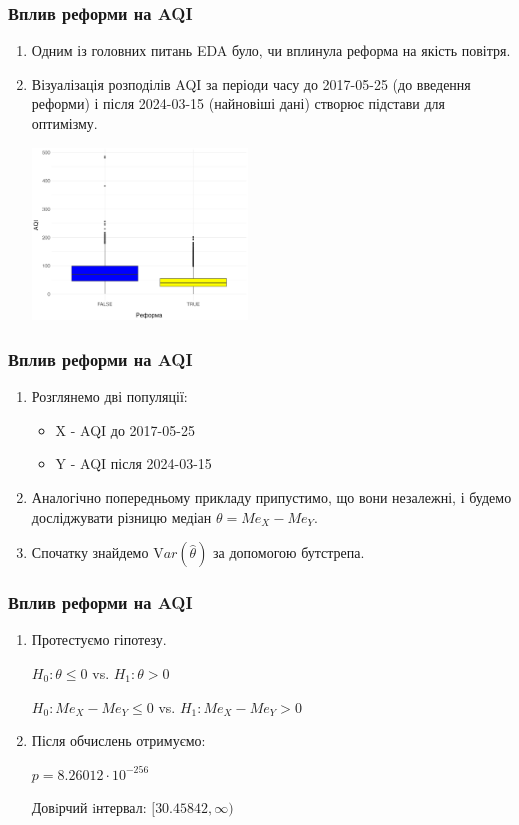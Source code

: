 \documentclass{beamer}
\begin{document}
\begin{frame}
  \frametitle{Вплив реформи на AQI}

  \begin{enumerate}
    \item Одним із головних питань EDA було, чи вплинула реформа на якість повітря. 
    \item Візуалізація розподілів AQI за періоди часу до 2017-05-25 (до введення реформи) і 
    після 2024-03-15 (найновіші дані) створює підстави для оптимізму.
  
    \begin{center}
      \includegraphics[height=1.8in]{./plots/lab2/hypotheses/reform_vs_aqi.png}
    \end{center}
  \end{enumerate}
\end{frame}

\begin{frame}
  \frametitle{Вплив реформи на AQI}

  \begin{enumerate}
    \item Розглянемо дві популяції:

    \begin{itemize}
      \item X - AQI до 2017-05-25
      \item Y - AQI після 2024-03-15
    \end{itemize}

    \item Аналогічно попередньому прикладу припустимо, що вони незалежні, 
    і будемо досліджувати різницю медіан $\theta = Me_X - Me_Y$.  
    
    \item Спочатку знайдемо $\mathrm Var(\hat{\theta})$ за допомогою бутстрепа.
  \end{enumerate}
\end{frame}

\begin{frame}
  \frametitle{Вплив реформи на AQI}

  \begin{enumerate}
    \item Протестуємо гіпотезу.  

    $H_0: \theta \le 0$ vs. $H_1: \theta > 0$  

    $H_0: Me_X - Me_Y \le 0$ vs. $H_1: Me_X - Me_Y > 0$
    
    \item Після обчислень отримуємо:
    
    $p = 8.26012 \cdot 10^{-256}$

    Довiрчий iнтервал: $ [30.45842, \infty) $
  \end{enumerate}
\end{frame}
\end{document}
